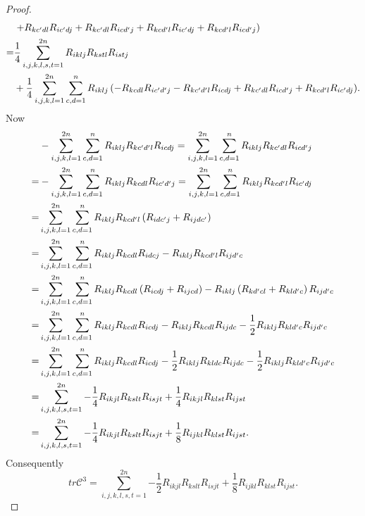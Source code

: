 \documentclass{amsart}
\theoremstyle{definition}
\theoremstyle{remark}
\numberwithin{equation}{section}
\begin{document}
\begin{proof}
\begin{align*}
    &\left. { + {R_{kc'dl}}{R_{ic'dj}} + {R_{kc'dl}}{R_{icd'j}} + {R_{kcd'l}}{R_{ic'dj}} + {R_{kcd'l}}{R_{icd'j}}} \right) \hfill \\
   =& \frac{1}{4} \sum\limits_{i,j,k,l,s,t = 1}^{2n} {{R_{iklj}}{R_{kstl}}{R_{istj}}}\\
    & + \frac{1}{4} \sum\limits_{i,j,k,l = 1}^{2n} {\sum\limits_{c,d = 1}^n {{R_{iklj}}\left( { - {R_{kcdl}}{R_{ic'd'j}} - {R_{kc'd'l}}{R_{icdj}} + {R_{kc'dl}}{R_{icd'j}} + {R_{kcd'l}}{R_{ic'dj}}} \right)} }.
\end{align*}
Now
\begin{align*}
   &- \sum\limits_{i,j,k,l = 1}^{2n} {\sum\limits_{c,d = 1}^n {{R_{iklj}}{R_{kc'd'l}}{R_{icdj}}} }  = \sum\limits_{i,j,k,l = 1}^{2n} {\sum\limits_{c,d = 1}^n {{R_{iklj}}{R_{kc'dl}}{R_{icd'j}}} }  \hfill \\
   =&  - \sum\limits_{i,j,k,l = 1}^{2n} {\sum\limits_{c,d = 1}^n {{R_{iklj}}{R_{kcdl}}{R_{ic'd'j}}} }  = \sum\limits_{i,j,k,l = 1}^{2n} {\sum\limits_{c,d = 1}^n {{R_{iklj}}{R_{kcd'l}}{R_{ic'dj}}} }  \hfill \\
   =& \sum\limits_{i,j,k,l = 1}^{2n} {\sum\limits_{c,d = 1}^n {{R_{iklj}}{R_{kcd'l}}\left( {{R_{idc'j}} + {R_{ijdc'}}} \right)} }  \hfill \\
   =& \sum\limits_{i,j,k,l = 1}^{2n} {\sum\limits_{c,d = 1}^n {{R_{iklj}}{R_{kcdl}}{R_{idcj}} - {R_{iklj}}{R_{kcd'l}}{R_{ijd'c}}} }  \hfill \\
   =& \sum\limits_{i,j,k,l = 1}^{2n} {\sum\limits_{c,d = 1}^n {{R_{iklj}}{R_{kcdl}}\left( {{R_{icdj}} + {R_{ijcd}}} \right) - {R_{iklj}}\left( {{R_{kd'cl}} + {R_{kld'c}}} \right){R_{ijd'c}}} }  \hfill \\
   =& \sum\limits_{i,j,k,l = 1}^{2n} {\sum\limits_{c,d = 1}^n {{R_{iklj}}{R_{kcdl}}{R_{icdj}} - {R_{iklj}}{R_{kcdl}}{R_{ijdc}} - \frac{1}{2}{R_{iklj}}{R_{kld'c}}{R_{ijd'c}}} }  \hfill \\
   =& \sum\limits_{i,j,k,l = 1}^{2n} {\sum\limits_{c,d = 1}^n {{R_{iklj}}{R_{kcdl}}{R_{icdj}} - \frac{1}{2}{R_{iklj}}{R_{kldc}}{R_{ijdc}} - \frac{1}{2}{R_{iklj}}{R_{kld'c}}{R_{ijd'c}}} }  \hfill \\
   =& \sum\limits_{i,j,k,l,s,t = 1}^{2n} { - \frac{1}{4}{R_{ikjl}}{R_{kslt}}{R_{isjt}} + \frac{1}{4}{R_{ikjl}}{R_{klst}}{R_{ijst}}}  \hfill \\
   =& \sum\limits_{i,j,k,l,s,t = 1}^{2n} { - \frac{1}{4}{R_{ikjl}}{R_{kslt}}{R_{isjt}} + \frac{1}{8}{R_{ijkl}}{R_{klst}}{R_{ijst}}} .
\end{align*}
Consequently
$$ tr{\mathcal{C}^3} =  \sum\limits_{i,j,k,l,s,t = 1}^{2n} { - \frac{1}{2}{R_{ikjl}}{R_{kslt}}{R_{isjt}} + \frac{1}{8}{R_{ijkl}}{R_{klst}}{R_{ijst}}}. $$
\end{proof}
\end{document}
